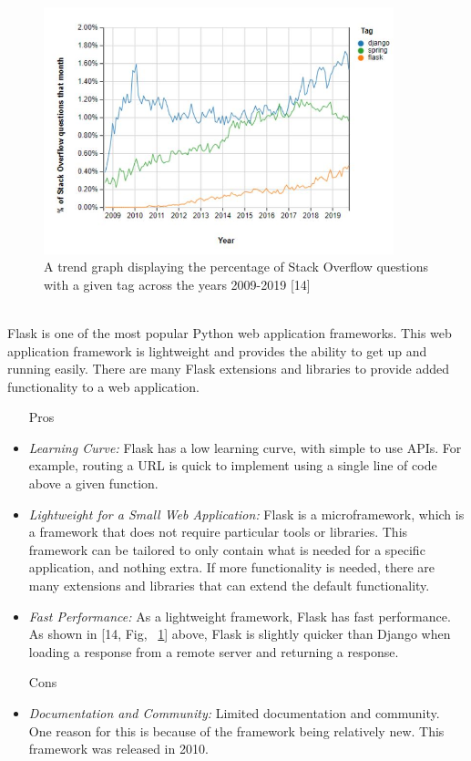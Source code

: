 \documentclass[12pt,journal,compsoc]{IEEEtran}
\newenvironment{subs}
  {\adjustwidth{1em}{0pt}}
  {\endadjustwidth}
\begin{document}
\begin{subs}
\begin{subs}
\begin{figure}[H]
\centering
\includegraphics[width=4in]{images/back_stack.JPG}
\caption{A trend graph displaying the percentage of Stack Overflow questions with a given tag across the years 2009-2019 [14]}
\label{fig:back_stack}
\end{figure}

\begin{subs}
\\
Flask is one of the most popular Python web application frameworks. This web application framework is lightweight and provides the ability to get up and running easily. There are many Flask extensions and libraries to provide added functionality to a web application.

\begin{subs}
\begin{itemize}
    \item [{Pros}]
    \item \emph{Learning Curve:} Flask has a low learning curve, with simple to use APIs. For example, routing a URL is quick to implement using a single line of code above a given function.
    \item \emph{Lightweight for a Small Web Application:} Flask is a microframework, which is a framework that does not require particular tools or libraries. This framework can be tailored to only contain what is needed for a specific application, and nothing extra. If more functionality is needed, there are many extensions and libraries that can extend the default functionality.
    \item \emph{Fast Performance:} As a lightweight framework, Flask has fast performance. As shown in [14, Fig, ~\ref{fig:back_stack}] above, Flask is slightly quicker than Django when loading a response from a remote server and returning a response.
    \item [{Cons}]
    \item \emph{Documentation and Community:} Limited documentation and community. One reason for this is because of the framework being relatively new. This framework was released in 2010.
\end{itemize}
\end{subs}


\end{subs}
\end{subs}
\end{subs}
\end{document}
